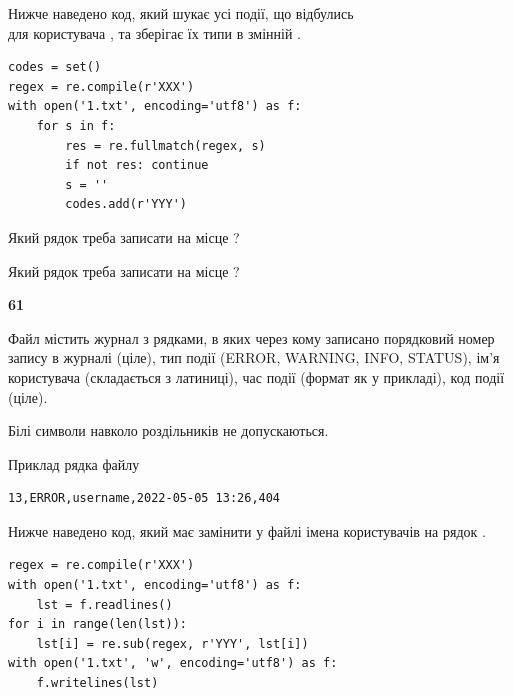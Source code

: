 Нижче наведено код, який шукає усі події, що відбулись\\ для користувача , та зберігає їх типи в змінній .



\begin{verbatim}
codes = set()
regex = re.compile(r'XXX')
with open('1.txt', encoding='utf8') as f:
    for s in f:
        res = re.fullmatch(regex, s)
        if not res: continue
        s = ''
        codes.add(r'YYY')
\end{verbatim}





Який рядок треба записати на місце  ?\par
\vspace{5mm}


Який рядок треба записати на місце  ?\par


\newpage

{\begin {center}\textbf{ 61}\end {center}}\par
Файл  містить журнал з рядками, в яких через кому записано поряд\-ко\-вий номер запису в журналі (ціле), тип події (ERROR, WARNING, INFO, STATUS), ім'я користувача (складається з латиниці), час події (фор\-мат як у прикладі), код події (ціле).

Білі символи навколо роздільників не допускаються.

Приклад рядка файлу



\begin{verbatim}
13,ERROR,username,2022-05-05 13:26,404
\end{verbatim}


Нижче наведено код, який має замінити у файлі імена користувачів на рядок .



\begin{verbatim}
regex = re.compile(r'XXX')
with open('1.txt', encoding='utf8') as f:
    lst = f.readlines()
for i in range(len(lst)):
    lst[i] = re.sub(regex, r'YYY', lst[i])
with open('1.txt', 'w', encoding='utf8') as f:
    f.writelines(lst)
\end{verbatim}







